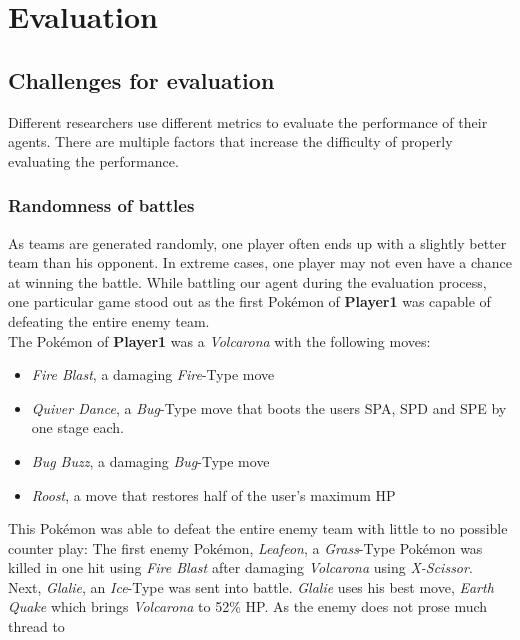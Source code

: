 
\chapter{Evaluation}
\label{ch:evaluation}

\section{Challenges for evaluation}
\label{sec:eval-challenges}
Different researchers use different metrics to evaluate the performance of their agents. 
There are multiple factors that increase the difficulty of properly evaluating the performance.

\subsection{Randomness of battles}
\label{sec:eval-challenges-randomness}
As teams are generated randomly, one player often ends up with a slightly better team than his opponent.
In extreme cases, one player may not even have a chance at winning the battle. While battling
our agent during the evaluation process, one particular game stood out as the first Pokémon of 
\textbf{Player1} was capable of defeating the entire enemy team. \\
The Pokémon of \textbf{Player1} was a \textit{Volcarona} with the following moves:
\begin{itemize}
    \item \textit{Fire Blast}, a damaging \textit{Fire}-Type move
    \item \textit{Quiver Dance}, a \textit{Bug}-Type move that boots the users \ac{SPA}, \ac{SPD} and 
    \ac{SPE} by one stage each.
    \item \textit{Bug Buzz}, a damaging \textit{Bug}-Type move
    \item \textit{Roost}, a move that restores half of the user's maximum \ac{HP}
\end{itemize}
This Pokémon was able to defeat the entire enemy team with little to no possible counter play:
The first enemy Pokémon, \textit{Leafeon}, a \textit{Grass}-Type Pokémon was killed in one hit using
\textit{Fire Blast} after damaging \textit{Volcarona} using \textit{X-Scissor}. \\
Next, \textit{Glalie}, an \textit{Ice}-Type was sent into battle. \textit{Glalie} uses his best move,
\textit{Earth Quake} which brings \textit{Volcarona} to 52\% \ac{HP}. As the enemy does not prose much thread to 
